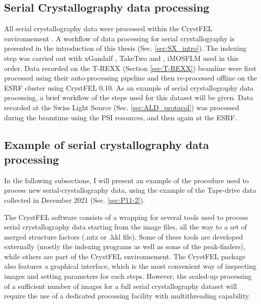 \subsection{Serial Crystallography data processing}

All serial crystallography data were processed within the CrystFEL environnement \parencite{whiteCrystFELSoftwareSuite2012,whiteProcessingSerialCrystallography2019}. A workflow of data processing for serial crystallography is presented in the introduction of this thesis (Sec. \ref{sec:SX_intro}). The indexing step was carried out with xGandalf \parencite{gevorkovXGANDALFExtendedGradient2019}, TakeTwo and \parencite{ginnTakeTwoIndexingAlgorithm2016}, iMOSFLM \parencite{powellRossmannFourierAutoindexing1999} used in this order. Data recorded on the T-REXX (Section \ref{sec:T-REXX}) beamline were first processed using their auto-processing pipeline and then re-processed offline on the ESRF cluster using CrystFEL 0.10. As an example of serial crystallography data processing, a brief workflow of the steps used for this dataset will be given. Data recorded at the Swiss Light Source (Sec. \ref{sec:ALD_protocol}) was processed during the beamtime using the PSI resources, and then again at the ESRF. 

\subsection{Example of serial crystallography data processing}

In the following subsections, I will present an example of the procedure used to process new serial-crystallography data, using the example of the Tape-drive data collected in December 2021 (Sec. \ref{sec:P11-2}).

The CrystFEL software \parencite{whiteProcessingSerialCrystallography2019} consists of a wrapping for several tools used to process serial crystallography data starting from the image files, all the way to a set of merged structure factors (.mtz or .hkl file). Some of these tools are developed externally (mostly the indexing programs as well as some of the peak-finders), while others are part of the CrystFEL environnement.  The CrystFEL package also features a graphical interface, which is the most convenient way of inspecting images and setting parameters for each steps. However, the scaled-up processing of a sufficient number of images for a full serial crystallography dataset will require the use of a dedicated processing facility with multithreading capability. 

